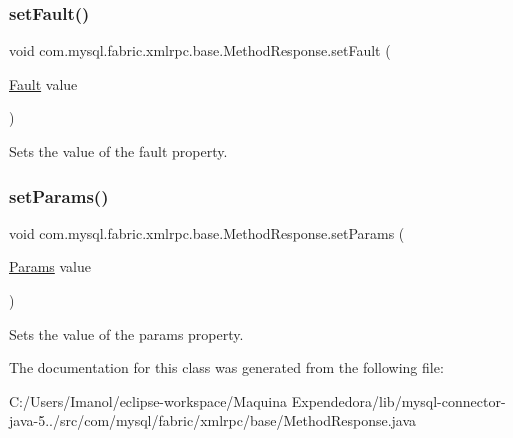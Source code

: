 \subsubsection{\texorpdfstring{set\+Fault()}{setFault()}}
{\footnotesize\ttfamily void com.\+mysql.\+fabric.\+xmlrpc.\+base.\+Method\+Response.\+set\+Fault (\begin{DoxyParamCaption}\item[{\mbox{\hyperlink{classcom_1_1mysql_1_1fabric_1_1xmlrpc_1_1base_1_1_fault}{Fault}}}]{value }\end{DoxyParamCaption})}

Sets the value of the fault property. \mbox{\label{classcom_1_1mysql_1_1fabric_1_1xmlrpc_1_1base_1_1_method_response_a0fd5a58cb654852a1dbfc8298747bb48}} 
\subsubsection{\texorpdfstring{set\+Params()}{setParams()}}
{\footnotesize\ttfamily void com.\+mysql.\+fabric.\+xmlrpc.\+base.\+Method\+Response.\+set\+Params (\begin{DoxyParamCaption}\item[{\mbox{\hyperlink{classcom_1_1mysql_1_1fabric_1_1xmlrpc_1_1base_1_1_params}{Params}}}]{value }\end{DoxyParamCaption})}

Sets the value of the params property. 

The documentation for this class was generated from the following file\+:\begin{DoxyCompactItemize}
\item 
C\+:/\+Users/\+Imanol/eclipse-\/workspace/\+Maquina Expendedora/lib/mysql-\/connector-\/java-\/5../src/com/mysql/fabric/xmlrpc/base/Method\+Response.\+java\end{DoxyCompactItemize}
